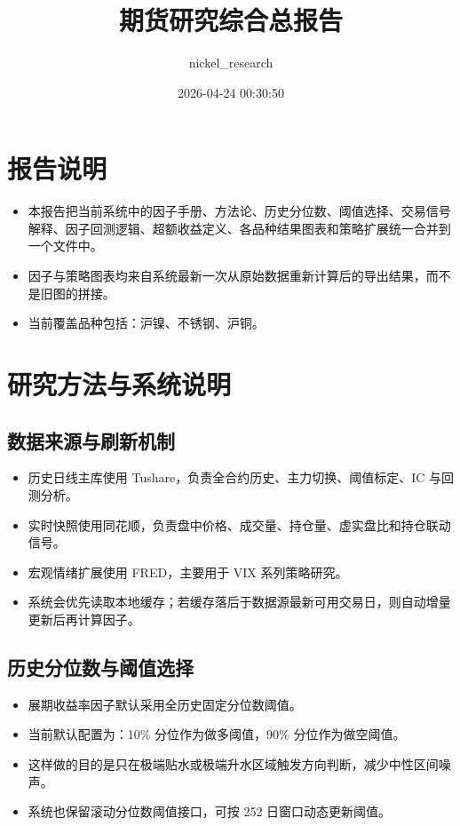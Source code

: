 \documentclass[11pt,a4paper]{ctexart}
\title{期货研究综合总报告}
\author{nickel\_research}
\date{2026-04-24 00:30:50}
\begin{document}
        \maketitle
        \tableofcontents
        \clearpage
        \section{报告说明}
        \begin{itemize}
        \item 本报告把当前系统中的因子手册、方法论、历史分位数、阈值选择、交易信号解释、因子回测逻辑、超额收益定义、各品种结果图表和策略扩展统一合并到一个文件中。
        \item 因子与策略图表均来自系统最新一次从原始数据重新计算后的导出结果，而不是旧图的拼接。
        \item 当前覆盖品种包括：沪镍、不锈钢、沪铜。
        \end{itemize}
        \section{研究方法与系统说明}
\subsection{数据来源与刷新机制}
\begin{itemize}
\item 历史日线主库使用 Tushare，负责全合约历史、主力切换、阈值标定、IC 与回测分析。
\item 实时快照使用同花顺，负责盘中价格、成交量、持仓量、虚实盘比和持仓联动信号。
\item 宏观情绪扩展使用 FRED，主要用于 VIX 系列策略研究。
\item 系统会优先读取本地缓存；若缓存落后于数据源最新可用交易日，则自动增量更新后再计算因子。
\end{itemize}

\subsection{历史分位数与阈值选择}
\begin{itemize}
\item 展期收益率因子默认采用全历史固定分位数阈值。
\item 当前默认配置为：10\% 分位作为做多阈值，90\% 分位作为做空阈值。
\item 这样做的目的是只在极端贴水或极端升水区域触发方向判断，减少中性区间噪声。
\item 系统也保留滚动分位数阈值接口，可按 252 日窗口动态更新阈值。
\end{itemize}
\end{document}

